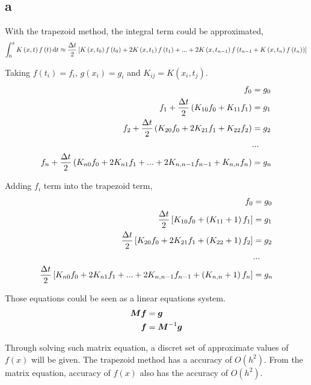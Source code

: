 \documentclass[letterpaper,10pt]{article}
\begin{document}
\subsection{a}
With the trapezoid method, the integral term could be approximated, 
\begin{equation}
  \int_0^x K\left(x,t\right)f\left(t\right)\mathrm{d}t \approx \frac{\Delta t}{2}
  \left[K\left(x,t_0\right)f\left(t_0\right)+2K\left(x,t_1\right)f\left(t_1\right)+...+2K\left(x,t_{n-1}\right)f\left(t_{n-1}+K\left(x,t_n\right)f\left(t_n\right)\right)\right]\notag
\end{equation}

Taking $f\left(t_i\right)=f_i$, $g\left(x_i\right) = g_i$ and $K_{ij} = K\left(x_i,t_j\right)$. 
\begin{align}
    f_0 &= g_0\notag\\
    f_1 + \frac{\Delta t}{2}\left(K_{10}f_0 + K_{11}f_1\right) &= g_1\notag\\
    f_2 + \frac{\Delta t}{2}\left(K_{20}f_0 + 2K_{21}f_1 + K_{22}f_2\right) &= g_2\notag\\
    &...\notag\\
    f_n + \frac{\Delta t}{2}\left(K_{n0}f_0 + 2K_{n1}f_1 + ...+ 2K_{n,n-1}f_{n-1}+K_{n,n}f_n\right) &= g_n\notag
\end{align}

Adding $f_i$ term into the trapezoid term, 
\begin{align}
  f_0 &= g_0\notag\\
  \frac{\Delta t}{2}\left[K_{10}f_0 + \left(K_{11}+1\right)f_1\right] &= g_1\notag\\
  \frac{\Delta t}{2}\left[K_{20}f_0 + 2K_{21}f_1 + \left(K_{22}+1\right)f_2\right] &= g_2\notag\\
  &...\notag\\
  \frac{\Delta t}{2}\left[K_{n0}f_0 + 2K_{n1}f_1 + ...+ 2K_{n,n-1}f_{n-1}+\left(K_{n,n}+1\right)f_n\right] &= g_n\notag
\end{align}

Those equations could be seen as a linear equations system. 
\begin{align}
  \bm{Mf} &= \bm{g}\notag\\
  \bm{f} &= \bm{M}^{-1}\bm{g}\notag
\end{align}

Through solving such matrix equation, a discret set of approximate values of $f\left(x\right)$ will be given. 
The trapezoid method has a accuracy of $O\left(h^2\right)$. From the matrix equation, accuracy of $f\left(x\right)$ also has the accuracy of $O\left(h^2\right)$. 
\end{document}
